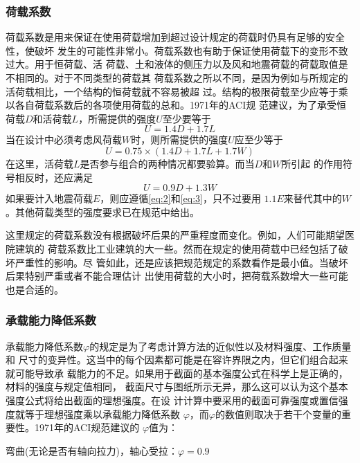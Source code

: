 \documentclass[12pt,a4paper]{book}
\begin{document}
\subsubsection{荷载系数}

荷载系数是用来保证在使用荷载增加到超过设计规定的荷载时仍具有足够的安全性，使破坏
发生的可能性非常小。荷载系数也有助于保证使用荷载下的变形不致过大。用于恒荷载、活
荷载、土和液体的侧压力以及风和地震荷载的荷载取值是不相同的。对于不同类型的荷载其
荷载系数之所以不同，是因为例如与所规定的活荷载相比，一个结构的恒荷载就不容易被超
过。结构的极限荷载至少应等于乘以各自荷载系数后的各项使用荷载的总和。1971年的ACI规
范建议，为了承受恒荷载$D$和活荷载$L$，所需提供的强度$U$至少要等于
\begin{equation}
  \label{eq:1} U=1.4D+1.7L
\end{equation}当在设计中必须考虑风荷载$W$时，则所需提供的强度$U$应至少等于
\begin{equation}
  \label{eq:2} U=0.75\times(1.4D+1.7L+1.7W)
\end{equation}在这里，活荷载$L$是否参与组合的两种情况都要验算。而当$D$和$W$所引起
的作用符号相反时，还应满足
\begin{equation}
  \label{eq:3} U=0.9D+1.3W
\end{equation}如果要计入地震荷载$E$，则应遵循\cref{eq:2}和\cref{eq:3}，只不过要用
$1.1E$来替代其中的$W$。其他荷载类型的强度要求已在规范中给出。

这里规定的荷载系数没有根据破坏后果的严重程度而变化。例如，人们可能期望医院建筑的
荷载系数比工业建筑的大一些。然而在规定的使用荷载中已经包括了破坏严重性的影响。尽
管如此，还是应该把规范规定的系数看作是最小值。当破坏后果特别严重或者不能合理估计
出使用荷载的大小时，把荷载系数增大一些可能也是合适的。

\subsubsection{承载能力降低系数}

承载能力降低系数$\varphi$的规定是为了考虑计算方法的近似性以及材料强度、工作质量和
尺寸的变异性。这当中的每个因素都可能是在容许界限之内，但它们组合起来就可能导致承
载能力的不足。如果用于截面的基本强度公式在科学上是正确的，材料的强度与规定值相同，
截面尺寸与图纸所示无异，那么这可以认为这个基本强度公式将给出截面的理想强度。在设
计计算中要采用的截面可靠强度或置信强度就等于理想强度乘以承载能力降低系数
$\varphi$，而$\varphi$的数值则取决于若干个变量的重要性。1971年的ACI规范建议的
$\varphi$值为：

弯曲(无论是否有轴向拉力)，轴心受拉：$\varphi=0.9$
\end{document}
